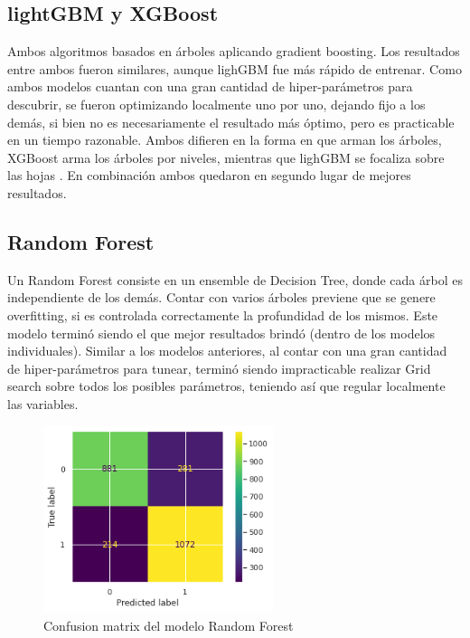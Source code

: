 \documentclass[titlepage,a4paper]{article}
\begin{document}
\subsection{lightGBM y XGBoost}\label{sub:lightgbm_xgboost}
Ambos algoritmos basados en árboles aplicando gradient boosting. Los resultados entre ambos fueron similares, aunque lighGBM fue más rápido de entrenar. Como ambos modelos cuantan con una gran cantidad de hiper-parámetros para descubrir, se fueron optimizando localmente uno por uno, dejando fijo a los demás, si bien no es necesariamente el resultado más óptimo, pero es practicable en un tiempo razonable. Ambos difieren en la forma en que arman los árboles, XGBoost arma los árboles por niveles, mientras que lighGBM se focaliza sobre las hojas \cite{lightgbm_vs_xgboost}. En combinación ambos quedaron en segundo lugar de mejores resultados.

\subsection{Random Forest}\label{sub:randomforest}

Un Random Forest consiste en un ensemble de Decision Tree, donde cada árbol es independiente de los demás. Contar con varios árboles previene que se genere overfitting, si es controlada correctamente la profundidad de los mismos. Este modelo terminó siendo el que mejor resultados brindó (dentro de los modelos individuales). Similar a los modelos anteriores, al contar con una gran cantidad de hiper-parámetros para tunear, terminó siendo impracticable realizar Grid search sobre todos los posibles parámetros, teniendo así que regular localmente las variables. 

\begin{figure}[H]
\centering
\includegraphics[width=0.6\textwidth]{images/conf_mat_rand_for.png}
\cprotect\caption{\label{fig:plot_tree} Confusion matrix del modelo Random Forest}
\end{figure}
\end{document}
